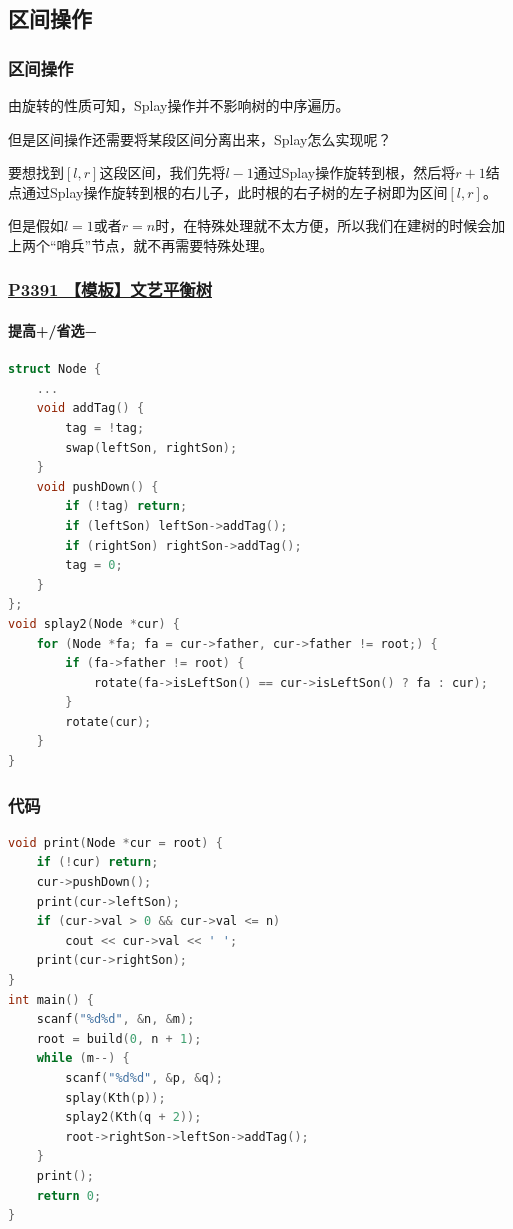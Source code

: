 \documentclass[utf8]{ctexbeamer}
\begin{document}
    \subsection{区间操作}

    \begin{frame}
        \frametitle{区间操作}
        由旋转的性质可知，Splay操作并不影响树的中序遍历。
        
        但是区间操作还需要将某段区间分离出来，Splay怎么实现呢？

        要想找到$[l,r]$这段区间，我们先将$l-1$通过Splay操作旋转到根，然后将$r+1$结点通过Splay操作旋转到根的右儿子，此时根的右子树的左子树即为区间$[l,r]$。

        但是假如$l=1$或者$r=n$时，在特殊处理就不太方便，所以我们在建树的时候会加上两个“哨兵”节点，就不再需要特殊处理。
    \end{frame}

    \begin{frame}[fragile]
        \frametitle{\href{https://www.luogu.com.cn/problem/P3391}{P3391 【模板】文艺平衡树}}
        \framesubtitle{\textcolor[RGB]{52, 152, 219}{提高+/省选−}}
        \begin{lstlisting}[language=c++]
struct Node {
    ...
    void addTag() {
        tag = !tag;
        swap(leftSon, rightSon);
    }
    void pushDown() {
        if (!tag) return;
        if (leftSon) leftSon->addTag();
        if (rightSon) rightSon->addTag();
        tag = 0;
    }
};
void splay2(Node *cur) {
    for (Node *fa; fa = cur->father, cur->father != root;) {
        if (fa->father != root) {
            rotate(fa->isLeftSon() == cur->isLeftSon() ? fa : cur);
        }
        rotate(cur);
    }
}

        \end{lstlisting}    
    \end{frame}
    
    \begin{frame}[fragile]
        \frametitle{代码}
        \begin{lstlisting}[language=c++]
void print(Node *cur = root) {
    if (!cur) return;
    cur->pushDown();
    print(cur->leftSon);
    if (cur->val > 0 && cur->val <= n)
        cout << cur->val << ' ';
    print(cur->rightSon);
}
int main() {
    scanf("%d%d", &n, &m);
    root = build(0, n + 1);
    while (m--) {
        scanf("%d%d", &p, &q);
        splay(Kth(p));
        splay2(Kth(q + 2));
        root->rightSon->leftSon->addTag();
    }
    print();
    return 0;
}
        \end{lstlisting}
    \end{frame}
\end{document}
